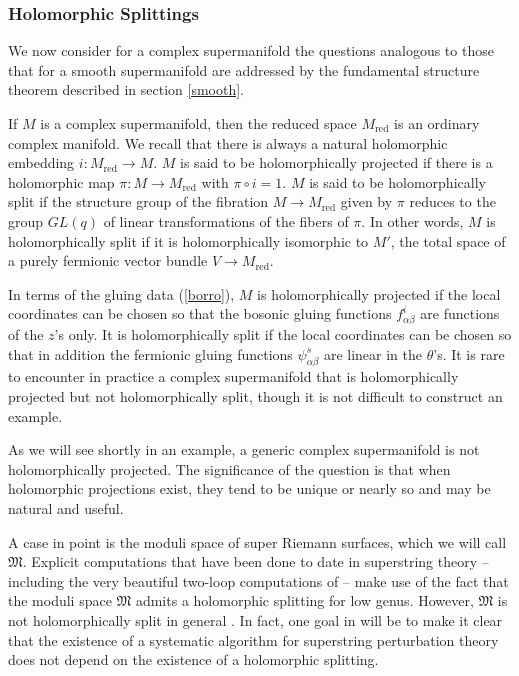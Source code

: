 \documentclass[11pt,a4paper]{article}
\def\red{{\mathrm{red}}}
\def\MM{{\mathfrak M}}
\begin{document}
\subsubsection{Holomorphic Splittings}\label{omgo}

We now consider for a complex supermanifold the questions analogous to those that for a smooth supermanifold
are addressed by the fundamental structure theorem described in section \ref{smooth}.

If  $M$ is a complex supermanifold, then the reduced space 
$M_\red$ is an ordinary complex manifold.  
We recall that there is always a natural holomorphic embedding $i:M_\red\to M$.
$M$ is said to be holomorphically projected if there is a holomorphic map $\pi:M\to M_\red$
with $\pi \circ i = 1$.  $M$ is said to be holomorphically split if the structure group of the fibration
$M\to M_\red$  given by $\pi$ reduces to the group $GL(q)$ of linear transformations of the fibers of $\pi$.
In other words, $M$ is holomorphically split if it is holomorphically isomorphic to $M'$, the total space of
a purely fermionic vector bundle $V\to M_\red$.

In terms of the gluing data (\ref{borro}), $M$ is holomorphically projected if the local coordinates can
be chosen so that the bosonic gluing functions $f^i_{\alpha\beta}$ are functions of the $z$'s only.  It is holomorphically
split if the local coordinates can be chosen so that in addition the fermionic gluing functions $\psi^s_{\alpha\beta}$
are linear in the $\theta$'s.  It is rare to encounter in practice a complex supermanifold that is holomorphically
projected but not holomorphically split, though it is not difficult to construct an example.  


As we will see shortly in an example, a generic complex supermanifold is not holomorphically projected. The significance of the question is
that when  holomorphic
projections exist, they tend to be unique or nearly so and may be natural and useful.

A case in point is the moduli space of super Riemann surfaces, which we will call $\MM$.
Explicit computations that have been done to date in superstring 
theory -- including the very beautiful two-loop computations of \cite{DPhmore} -- make
use of the fact that the moduli space $\MM$ admits a holomorphic 
splitting for low genus.  However,  $\MM$ is not holomorphically split in general \cite{DW}.  
In fact, one goal  in \cite{reconsidered}
will be  to make it clear that the existence of a systematic algorithm for 
superstring perturbation theory does not depend on the existence of a holomorphic
splitting.  
\end{document}
